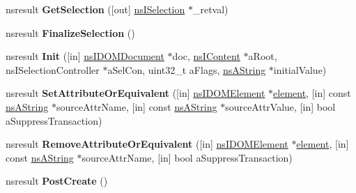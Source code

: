 \begin{DoxyCompactItemize}
\item 
\mbox{\label{interfacens_i_editor_a1c7dc13b309aa57e25550bf6e20e4b6b}} 
nsresult {\bfseries Get\+Selection} (\mbox{[}out\mbox{]} \hyperlink{interfacens_i_selection}{ns\+I\+Selection} $\ast$\+\_\+retval)
\item 
\mbox{\label{interfacens_i_editor_a41680f63243e0b99120c808a18c18745}} 
nsresult {\bfseries Finalize\+Selection} ()
\item 
\mbox{\label{interfacens_i_editor_a2f4becc108abf0d2d49a6d62f187f82b}} 
nsresult {\bfseries Init} (\mbox{[}in\mbox{]} \hyperlink{interfacens_i_d_o_m_document}{ns\+I\+D\+O\+M\+Document} $\ast$doc, \hyperlink{interfacens_i_content}{ns\+I\+Content} $\ast$a\+Root, ns\+I\+Selection\+Controller $\ast$a\+Sel\+Con, uint32\+\_\+t a\+Flags, \hyperlink{structns_string_container}{ns\+A\+String} $\ast$initial\+Value)
\item 
\mbox{\label{interfacens_i_editor_af29ddaebd4704a6b21b458cb908c875d}} 
nsresult {\bfseries Set\+Attribute\+Or\+Equivalent} (\mbox{[}in\mbox{]} \hyperlink{interfacens_i_d_o_m_element}{ns\+I\+D\+O\+M\+Element} $\ast$\hyperlink{structelement}{element}, \mbox{[}in\mbox{]} const \hyperlink{structns_string_container}{ns\+A\+String} $\ast$source\+Attr\+Name, \mbox{[}in\mbox{]} const \hyperlink{structns_string_container}{ns\+A\+String} $\ast$source\+Attr\+Value, \mbox{[}in\mbox{]} bool a\+Suppress\+Transaction)
\item 
\mbox{\label{interfacens_i_editor_a891507e87a02cd0fc194f29be3341624}} 
nsresult {\bfseries Remove\+Attribute\+Or\+Equivalent} (\mbox{[}in\mbox{]} \hyperlink{interfacens_i_d_o_m_element}{ns\+I\+D\+O\+M\+Element} $\ast$\hyperlink{structelement}{element}, \mbox{[}in\mbox{]} const \hyperlink{structns_string_container}{ns\+A\+String} $\ast$source\+Attr\+Name, \mbox{[}in\mbox{]} bool a\+Suppress\+Transaction)
\item 
\mbox{\label{interfacens_i_editor_a582b6cc805c1fa89601950f8f0cf1f3c}} 
nsresult {\bfseries Post\+Create} ()
\item 
\mbox{\label{interfacens_i_editor_ad0dcbfe8c94c25deeeddea1125519d89}} 

\end{DoxyCompactItemize}
